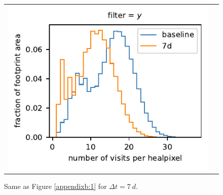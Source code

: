 \documentclass[preprintm,linenumbers]{aastex631}
\begin{document}
\begin{figure}
\begin{tabular}{@{}c@{}c@{}}
				\includegraphics{results/histograms/hist_first_year_one_snap_v4_0_10yrs_db_noDD_noTwi_CountMetric_doAllTemplateMetrics_reduceCount_y_7_noDD_noTwi.pdf} \\
    			
			\end{tabular}
			\caption{ Same as Figure \ref{appendixb:1} for $\Delta t = 7\ \si{d}$. \label{appendixb:2}}
		\end{figure}
\end{document}
